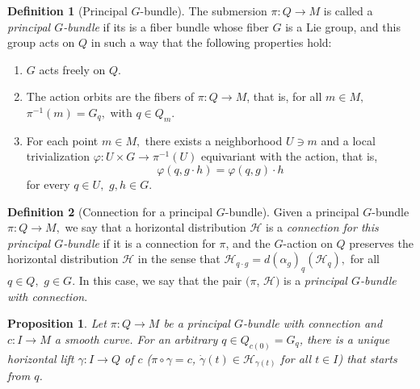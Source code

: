 \documentclass [xcolor=svgnames, t] {beamer}
\theoremstyle{definition}
\newtheorem{df}{Definition}
\theoremstyle{plain}
\newtheorem{prop}{Proposition}
\theoremstyle{remark}
\begin{document}
\begin{frame}
	\begin{df}[Principal $ G $-bundle]\label{df:principalGbundle}
	The submersion $ \pi: Q \rightarrow M$  is called a \textit{principal $ G $-bundle} if its is a fiber bundle whose fiber $ G $ is a Lie group, and this group acts on $ Q $ in such a way that the following properties hold:
	\begin{enumerate}
		\item $ G $ acts freely on $ Q $.
		\item The action orbits are the fibers of $ \pi:Q \rightarrow {M} $, that is, for all $ m\in M, $ $ \pi^{-1}(m) = G_q, $ with $ q\in Q_m. $ 
		\item For each point $ m\in M, $ there exists a neighborhood $ U\ni m $ and a local trivialization $ \varphi: U\times G \rightarrow \pi^{-1}(U)$ equivariant with the action, that is,
			$$ \varphi(q, g\cdot h)=\varphi(q,g)\cdot h  $$ 
			for every $ q\in U, $ $ g,h\in G. $ 
	\end{enumerate}
\end{df}
\begin{df}[Connection for a principal $ G $-bundle]
	Given a principal $ G $-bundle $ \pi: Q \rightarrow M, $ we say that a horizontal distribution $ \mathcal{H} $ is a \textit{connection for this principal $ G $-bundle} if it is a connection for $ \pi $, and the $ G $-action on $ Q $ preserves the horizontal distribution $ \mathcal{H} $ in the sense that $ \mathcal{H}_{q\cdot g} = d(\alpha_g)_q (\mathcal{H}_q), $ for all $ q\in Q, $ $ g\in G $. In this case, we say that the pair $ (\pi$, $ \mathcal{H}) $ is a \textit{principal $ G $-bundle with connection}. 

\end{df}
\begin{prop}
	Let $ \pi: Q \rightarrow M $ be a principal $ G $-bundle with connection and $ c: I \rightarrow M $ a smooth curve. For an arbitrary $ q\in Q_{c(0)}= G_q $, there is a unique horizontal lift $ \gamma: I \rightarrow Q $ of $ c $ ($\pi\circ\gamma =c$, $ \dot{\gamma}(t)\in \mathcal{H}_{\gamma(t)} $ for all $ t\in I $) that starts from $ q $.    	
\end{prop}
\end{frame}
\end{document}

